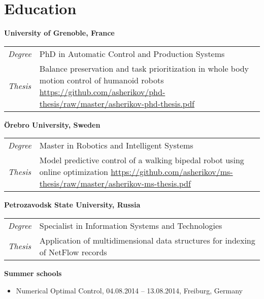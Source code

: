 \documentclass[a4paper,10pt]{report}
\begin{document}
\section{Education}
\begin{adjustwidth}{0.5cm}{0pt}
    {\bf {} University of Grenoble, France}\\
    \begin{tabularx}{\linewidth}{l X}
        {\it Degree}    & PhD in Automatic Control and Production Systems\\
        {\it Thesis}    &   Balance preservation and task prioritization in whole
                            body motion control of humanoid robots
                            \href{https://github.com/asherikov/phd-thesis/raw/master/asherikov-phd-thesis.pdf}
                            {https://github.com/asherikov/phd-thesis/raw/master/asherikov-phd-thesis.pdf}\\
    \end{tabularx}

    \vspace{0.15cm}

    {\bf {} \"Orebro University, Sweden}\\
    \begin{tabularx}{\linewidth}{l X}
        {\it Degree}    & Master in Robotics and Intelligent Systems\\
        {\it Thesis}    &   Model predictive control of a walking bipedal robot
                            using online optimization
                            \href{https://github.com/asherikov/ms-thesis/raw/master/asherikov-ms-thesis.pdf}
                            {https://github.com/asherikov/ms-thesis/raw/master/asherikov-ms-thesis.pdf}\\
    \end{tabularx}

    \vspace{0.15cm}

    {\bf {} Petrozavodsk State University, Russia}\\
    \begin{tabularx}{\linewidth}{l X}
        {\it Degree}    & Specialist in Information Systems and Technologies\\
        {\it Thesis}    &   Application of multidimensional data structures
                            for indexing of NetFlow records\\
    \end{tabularx}

    \vspace{0.15cm}

    {\bf Summer schools}
    \begin{itemize}
        \item Numerical Optimal Control, 04.08.2014 -- 13.08.2014, Freiburg, Germany
    \end{itemize}
\end{adjustwidth}
\end{document}
